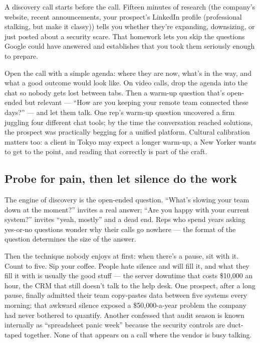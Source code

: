 A discovery call starts before the call. Fifteen minutes of research (the company's website, recent announcements, your prospect's LinkedIn profile (professional stalking, but make it classy)) tells you whether they're expanding, downsizing, or just posted about a security scare. That homework lets you skip the questions Google could have answered and establishes that you took them seriously enough to prepare.


Open the call with a simple agenda: where they are now, what's in the way, and what a good outcome would look like. On video calls, drop the agenda into the chat so nobody gets lost between tabs. Then a warm-up question that's open-ended but relevant — ``How are you keeping your remote team connected these days?'' — and let them talk. One rep's warm-up question uncovered a firm juggling four different chat tools; by the time the conversation reached solutions, the prospect was practically begging for a unified platform. Cultural calibration matters too: a client in Tokyo may expect a longer warm-up, a New Yorker wants to get to the point, and reading that correctly is part of the craft.



\subsection{Probe for pain, then let silence do the work}


The engine of discovery is the open-ended question. ``What's slowing your team down at the moment?'' invites a real answer; ``Are you happy with your current system?'' invites ``yeah, mostly'' and a dead end. Reps who spend years asking yes-or-no questions wonder why their calls go nowhere — the format of the question determines the size of the answer.


Then the technique nobody enjoys at first: when there's a pause, sit with it. Count to five. Sip your coffee. People hate silence and will fill it, and what they fill it with is usually the good stuff — the server downtime that costs \$10,000 an hour, the CRM that still doesn't talk to the help desk. One prospect, after a long pause, finally admitted their team copy-pastes data between five systems every morning; that awkward silence exposed a \$50,000-a-year problem the company had never bothered to quantify. Another confessed that audit season is known internally as ``spreadsheet panic week'' because the security controls are duct-taped together. None of that appears on a call where the vendor is busy talking.


